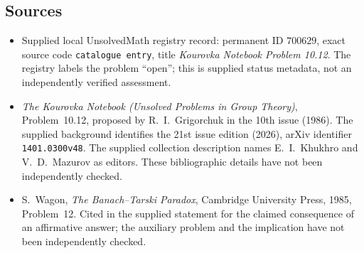 \documentclass[11pt]{article}
\begin{document}
\subsection{Sources}
\begin{itemize}
\item Supplied local UnsolvedMath registry record: permanent ID \(700629\), exact source code \texttt{catalogue entry}, title \emph{Kourovka Notebook Problem 10.12}. The registry labels the problem ``open''; this is supplied status metadata, not an independently verified assessment.
\item \emph{The Kourovka Notebook (Unsolved Problems in Group Theory)}, Problem~10.12, proposed by R.~I.~Grigorchuk in the 10th issue (1986). The supplied background identifies the 21st issue edition (2026), arXiv identifier \texttt{1401.0300v48}. The supplied collection description names E.~I.~Khukhro and V.~D.~Mazurov as editors. These bibliographic details have not been independently checked.
\item S.~Wagon, \emph{The Banach--Tarski Paradox}, Cambridge University Press, 1985, Problem~12. Cited in the supplied statement for the claimed consequence of an affirmative answer; the auxiliary problem and the implication have not been independently checked.
\end{itemize}
\end{document}
